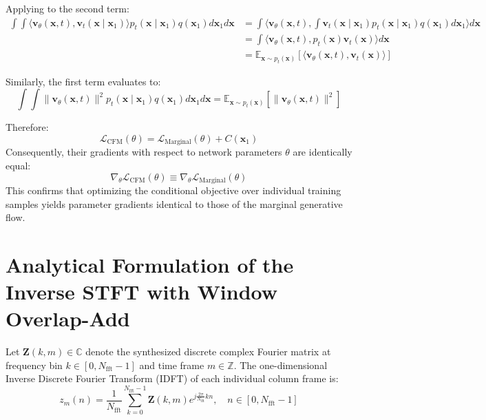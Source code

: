 Applying  to the second term:
\begin{align}
    \int \int \langle \mathbf{v}_\theta(\mathbf{x}, t), \mathbf{v}_t(\mathbf{x} \mid \mathbf{x}_1) \rangle p_t(\mathbf{x} \mid \mathbf{x}_1) q(\mathbf{x}_1) d\mathbf{x}_1 d\mathbf{x} &= \int \langle \mathbf{v}_\theta(\mathbf{x}, t), \int \mathbf{v}_t(\mathbf{x} \mid \mathbf{x}_1) p_t(\mathbf{x} \mid \mathbf{x}_1) q(\mathbf{x}_1) d\mathbf{x}_1 \rangle d\mathbf{x} \nonumber \\
    &= \int \langle \mathbf{v}_\theta(\mathbf{x}, t), p_t(\mathbf{x}) \mathbf{v}_t(\mathbf{x}) \rangle d\mathbf{x} \nonumber \\
    &= \mathbb{E}_{\mathbf{x} \sim p_t(\mathbf{x})} \left[ \langle \mathbf{v}_\theta(\mathbf{x}, t), \mathbf{v}_t(\mathbf{x}) \rangle \right]
    \label{eq:app_term_equivalence}
\end{align}

Similarly, the first term evaluates to:
\begin{equation}
    \int \int \|\mathbf{v}_\theta(\mathbf{x}, t)\|^2 p_t(\mathbf{x} \mid \mathbf{x}_1) q(\mathbf{x}_1) d\mathbf{x}_1 d\mathbf{x} = \mathbb{E}_{\mathbf{x} \sim p_t(\mathbf{x})} \left[ \|\mathbf{v}_\theta(\mathbf{x}, t)\|^2 \right]
\end{equation}

Therefore:
\begin{equation}
    \mathcal{L}_{\text{CFM}}(\theta) = \mathcal{L}_{\text{Marginal}}(\theta) + C(\mathbf{x}_1)
    \label{eq:app_final_equivalence}
\end{equation}
Consequently, their gradients with respect to network parameters $\theta$ are identically equal:
\begin{equation}
    \nabla_\theta \mathcal{L}_{\text{CFM}}(\theta) \equiv \nabla_\theta \mathcal{L}_{\text{Marginal}}(\theta)
\end{equation}
This confirms that optimizing the conditional objective over individual training samples yields parameter gradients identical to those of the marginal generative flow.

\section{Analytical Formulation of the Inverse STFT with Window Overlap-Add}
Let $\mathbf{Z}(k, m) \in \mathbb{C}$ denote the synthesized discrete complex Fourier matrix at frequency bin $k \in [0, N_{\text{fft}}-1]$ and time frame $m \in \mathbb{Z}$. The one-dimensional Inverse Discrete Fourier Transform (IDFT) of each individual column frame is:
\begin{equation}
    z_m(n) = \frac{1}{N_{\text{fft}}} \sum_{k=0}^{N_{\text{fft}}-1} \mathbf{Z}(k, m) e^{j \frac{2\pi}{N_{\text{fft}}} kn}, \quad n \in [0, N_{\text{fft}}-1]
    \label{eq:app_idft}
\end{equation}

